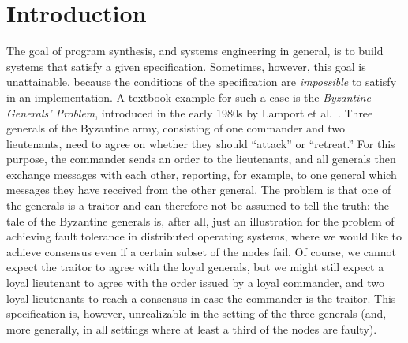 \documentclass{LMCS}
\theoremstyle{plain}\newtheorem{theorem}[thm]{Theorem}
\theoremstyle{plain}\newtheorem{lemma}[thm]{Lemma}
\theoremstyle{plain}\newtheorem{proposition}[thm]{Proposition}
\theoremstyle{plain}\newtheorem{corollary}[thm]{Corollary}
\theoremstyle{definition}\newtheorem{definition}{Definition}[section]
\begin{document}
\maketitle

\section{Introduction}


The goal of program synthesis, and systems engineering in general, is to build systems that satisfy a given specification. Sometimes, however, 
this goal is unattainable, because the conditions of the specification are \emph{impossible} to satisfy in an implementation. A textbook example for such a case is the \emph{Byzantine Generals' Problem}, introduced in the early 1980s by Lamport et al.~\cite{DBLP:journals/toplas/LamportSP82}. Three generals of the Byzantine army, consisting of one commander and two lieutenants, need to agree on whether they should ``attack'' or ``retreat.''  For this purpose, the commander sends an order to the lieutenants, and all generals then exchange messages with each other, reporting, for example, to one general which messages they have received from the other general. The problem is that one of the generals is a traitor and can therefore not be assumed to tell the truth: the tale of the Byzantine generals is, after all, just an illustration for the problem of achieving fault tolerance in distributed operating systems, where we would like to achieve consensus even if a certain subset of the nodes fail. 
Of course, we cannot expect the traitor to agree with the loyal generals, but we might still expect a loyal lieutenant to agree with the order issued by a loyal commander, and two loyal lieutenants to reach a consensus in case the commander is the traitor. This specification is, however, unrealizable in the setting of the three generals (and, more generally, in all settings where at least a third of the nodes are faulty).
\end{document}
